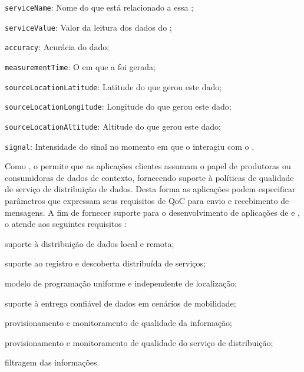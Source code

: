 \begin{alineas}
	\item \texttt{serviceName}: Nome do \smartobj que está relacionado a essa \msg;

	\item \texttt{serviceValue}: Valor da leitura dos dados do \smartobj;

	\item \texttt{accuracy}: Acurácia do dado;

	\item \texttt{measurementTime}: O \timestamp em que a \msg foi gerada;

	\item \texttt{sourceLocationLatitude}: Latitude do \mhub que gerou este dado;

	\item \texttt{sourceLocationLongitude}: Longitude do \mhub que gerou este dado;

	\item \texttt{sourceLocationAltitude}: Altitude do \mhub que gerou este dado;

	\item \texttt{signal}: Intensidade do sinal no momento em que o \smartobj interagiu com o \stwopa.
\end{alineas}

Como \middleware, o \cddl permite que as aplicações clientes assumam o papel de produtoras ou consumidoras de dados de contexto, fornecendo suporte à políticas de qualidade de serviço de distribuição de dados. Desta forma as aplicações podem especificar parâmetros que expressam seus requisitos de QoC para envio e recebimento de mensagens. A fim de fornecer suporte para o desenvolvimento de aplicações de \iot e \iomt, o \cddl atende aos seguintes requisitos \cite{muniz:2017}:

\begin{alineas}
	\item suporte à distribuição de dados local e remota;

	\item suporte ao registro e descoberta distribuída de serviços;

	\item modelo de programação uniforme e independente de localização;

	\item suporte à entrega confiável de dados em cenários de mobilidade;

	\item provisionamento e monitoramento de qualidade da informação;

	\item provisionamento e monitoramento de qualidade do serviço de distribuição;

	\item filtragem das informações.
\end{alineas}

